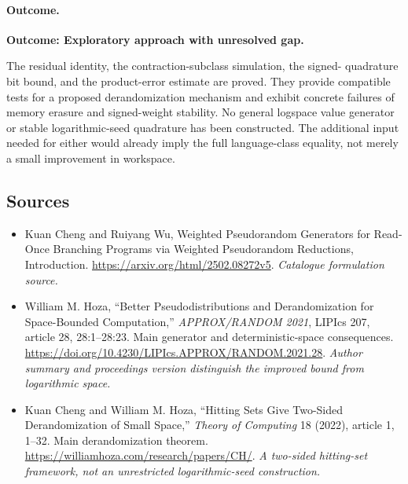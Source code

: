 \documentclass[11pt,a4paper]{article}
\numberwithin{equation}{section}
\begin{document}
\paragraph{Outcome.}
\textbf{Outcome: Exploratory approach with unresolved gap.}

The residual identity, the contraction-subclass simulation, the signed-
quadrature bit bound, and the product-error estimate are proved. They
provide compatible tests for a proposed derandomization mechanism and
exhibit concrete failures of memory erasure and signed-weight stability.
No general logspace value generator or stable logarithmic-seed quadrature
has been constructed. The additional input needed for either would
already imply the full language-class equality, not merely a small
improvement in workspace.

\subsection{Sources}
\begin{itemize}\raggedright
\item[\textnormal{[S1]}]\hypertarget{source:30004922:1}{} Kuan Cheng and Ruiyang Wu, Weighted Pseudorandom Generators for Read-Once Branching Programs via Weighted Pseudorandom Reductions, Introduction.
\url{https://arxiv.org/html/2502.08272v5}.
{\small\textit{Catalogue formulation source.}}
\item[\textnormal{[E1]}]\hypertarget{extra:30004922:1}{} William M. Hoza, ``Better Pseudodistributions and Derandomization for Space-Bounded Computation,'' \emph{APPROX/RANDOM 2021}, LIPIcs 207, article 28, 28:1--28:23. Main generator and deterministic-space consequences.
\url{https://doi.org/10.4230/LIPIcs.APPROX/RANDOM.2021.28}.
{\small\textit{Author summary and proceedings version distinguish the improved bound from logarithmic space.}}
\item[\textnormal{[E2]}]\hypertarget{extra:30004922:2}{} Kuan Cheng and William M. Hoza, ``Hitting Sets Give Two-Sided Derandomization of Small Space,'' \emph{Theory of Computing} 18 (2022), article 1, 1--32. Main derandomization theorem.
\url{https://williamhoza.com/research/papers/CH/}.
{\small\textit{A two-sided hitting-set framework, not an unrestricted logarithmic-seed construction.}}
\end{itemize}
\end{document}

